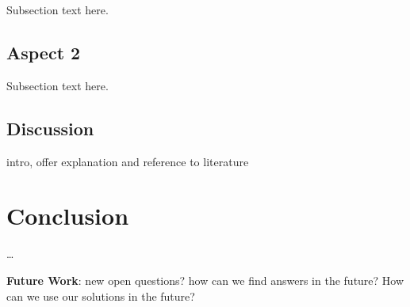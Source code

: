 Subsection text here.

\subsection{Aspect 2}\label{aspect-2}

Subsection text here.

\subsection{Discussion}\label{discussion}

intro, offer explanation and reference to literature

\section{Conclusion}\label{conclusion}

\ldots{}

\textbf{Future Work}: new open questions? how can we find answers in the
future? How can we use our solutions in the future?
